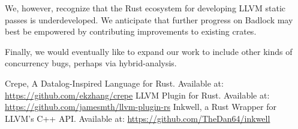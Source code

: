 \documentclass[conference]{IEEEtran}
\begin{document}
We, however, recognize that the Rust ecosystem for developing LLVM static passes is underdeveloped. We anticipate that further progress on Badlock may best be empowered by contributing improvements to existing crates.

Finally, we would eventually like to expand our work to include other kinds of concurrency bugs, perhaps via hybrid-analysis.

\begin{thebibliography}{00}
     Crepe, A Datalog-Inspired Language for Rust. Available at: \url{https://github.com/ekzhang/crepe}
     LLVM Plugin for Rust. Available at: \url{https://github.com/jamesmth/llvm-plugin-rs}
     Inkwell, a Rust Wrapper for LLVM's C++ API. Available at: \url{https://github.com/TheDan64/inkwell}
\end{thebibliography}
    
\end{document}
